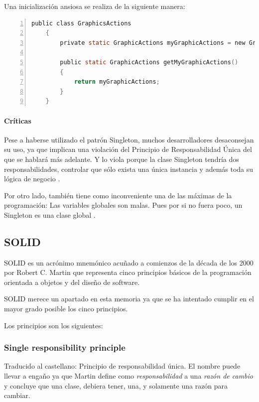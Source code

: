 Una inicializaci\'on ansiosa se realiza de la siguiente manera:
\begin{lstlisting}[language=C, numbers=left, showspaces=false, breaklines=true, tabsize=2]
    public class GraphicsActions 
    {
        private static GraphicActions myGraphicActions = new GraphicActions();
        
        public static GraphicActions getMyGraphicActions()
        { 
            return myGraphicActions;
        }
    }
\end{lstlisting}

\paragraph{Cr\'iticas}Pese a haberse utilizado el patr\'on Singleton, muchos desarrolladores desaconsejan su uso, ya que implican
una violaci\'on del Principio de Responsabilidad \'Unica del que se hablar\'a m\'as adelante. Y lo viola porque
la clase Singleton tendr\'ia dos responsabilidades, controlar que s\'olo exista una \'unica instancia y adem\'as
toda su l\'ogica de negocio \cite{Singleton:EVIL}.

Por otro lado, tambi\'en tiene como inconveniente una de las m\'aximas de la programaci\'on: Las variables globales
son malas. Pues por si no fuera poco, un Singleton es una clase global \cite{Singleton:EVIL}.

\subsection{SOLID}
SOLID es un acr\'{o}nimo mnem\'{o}nico acu\~{n}ado a comienzos de la d\'{e}cada de los 2000 por 
Robert C. Martin \cite{SOLID:ADefinition}
que representa cinco principios b\'{a}sicos de la programaci\'{o}n orientada a objetos y del dise\~{n}o de software.

SOLID merece un apartado en esta memoria ya que se ha intentado cumplir en el mayor grado posible los cinco principios.

Los principios son los siguientes:
\subsubsection{Single responsibility principle}
Traducido al castellano: Principio de responsabilidad \'{u}nica. El nombre puede llevar a enga\~{n}o ya que Martin define como 
\emph{responsabilidad}
a una \emph{raz\'{o}n de cambio} \cite{SOLID:SRP} y concluye que una clase, debiera tener, una, y solamente una raz\'{o}n 
para cambiar.


